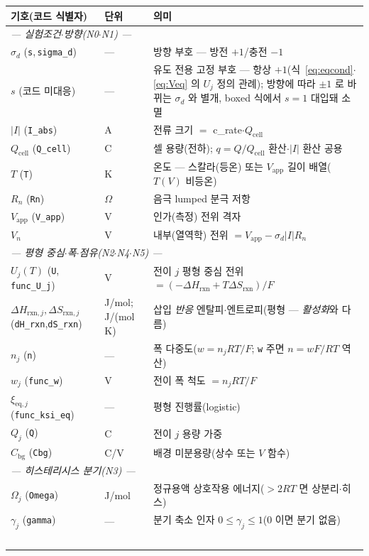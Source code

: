\documentclass[11pt,a4paper]{article}
\newcommand{\eq}{\mathrm{eq}}
\newcommand{\app}{\mathrm{app}}
\newcommand{\cell}{\mathrm{cell}}
\newcommand{\bg}{\mathrm{bg}}
\newcommand{\rxn}{\mathrm{rxn}}
\newcommand{\code}[1]{\texttt{#1}}
\begin{document}
\begin{longtable}{p{} p{} p{}}
\toprule 기호(코드 식별자) & 단위 & 의미 \\ \midrule \endhead
\multicolumn{3}{l}{\emph{— 실험조건$\cdot$방향(N0$\cdot$N1) —}}\\
$\sigma_d$ (\code{s},\,\code{sigma\_d}) & --- & 방향 부호 — 방전 $+1$/충전 $-1$ \\
$s$ (코드 미대응) & --- & 유도 전용 고정 부호 — 항상 $+1$(식~\eqref{eq:eqcond}$\cdot$\eqref{eq:Veq} 의 $U_j$ 정의 관례); 방향에 따라 $\pm1$ 로 바뀌는 $\sigma_d$ 와 별개, boxed 식에서 $s{=}1$ 대입돼 소멸 \\
$|I|$ (\code{I\_abs}) & A & 전류 크기 $=$ c\_rate$\cdot Q_\cell$ \\
$Q_\cell$ (\code{Q\_cell}) & C & 셀 용량(전하); $q=Q/Q_\cell$ 환산$\cdot$$|I|$ 환산 공용 \\
$T$ (\code{T}) & K & 온도 — 스칼라(등온) 또는 $V_\app$ 길이 배열($T(V)$ 비등온) \\
$R_n$ (\code{Rn}) & $\Omega$ & 음극 lumped 분극 저항 \\
$V_\app$ (\code{V\_app}) & V & 인가(측정) 전위 격자 \\
$V_n$ & V & 내부(열역학) 전위 $=V_\app-\sigma_d|I|R_n$ \\
\multicolumn{3}{l}{\emph{— 평형 중심$\cdot$폭$\cdot$점유(N2$\cdot$N4$\cdot$N5) —}}\\
$U_j(T)$ (\code{U},\,\code{func\_U\_j}) & V & 전이 $j$ 평형 중심 전위 $=(-\Delta H_\rxn+T\Delta S_\rxn)/F$ \\
$\Delta H_{\rxn,j},\Delta S_{\rxn,j}$ (\code{dH\_rxn},\code{dS\_rxn}) & {\footnotesize J/mol;\,J/(mol\,K)} & 삽입 \emph{반응} 엔탈피$\cdot$엔트로피(평형 — \emph{활성화}와 다름) \\
$n_j$ (\code{n}) & --- & 폭 다중도($w=n_jRT/F$; \code{w} 주면 $n=wF/RT$ 역산) \\
$w_j$ (\code{func\_w}) & V & 전이 폭 척도 $=n_jRT/F$ \\
$\xi_{\eq,j}$ (\code{func\_ksi\_eq}) & --- & 평형 진행률(logistic) \\
$Q_j$ (\code{Q}) & C & 전이 $j$ 용량 가중 \\
$C_\bg$ (\code{Cbg}) & C/V & 배경 미분용량(상수 또는 $V$ 함수) \\
\multicolumn{3}{l}{\emph{— 히스테리시스 분기(N3) —}}\\
$\Omega_j$ (\code{Omega}) & J/mol & 정규용액 상호작용 에너지($>2RT$ 면 상분리$\cdot$히스) \\
$\gamma_j$ (\code{gamma}) & --- & 분기 축소 인자 $0\le\gamma_j\le1$($0$ 이면 분기 없음) \\
$$
\end{longtable}
\end{document}
